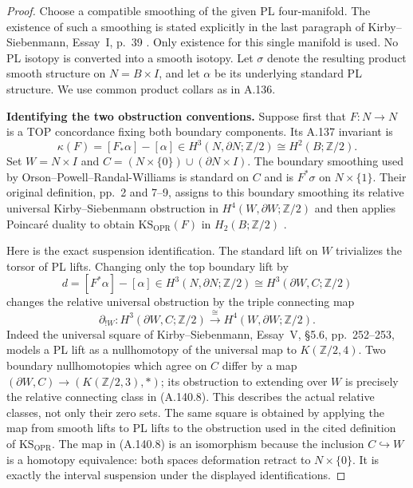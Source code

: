 \begin{proof}
Choose a compatible smoothing of the given PL four-manifold.
The existence of such a smoothing is stated explicitly in the
last paragraph of Kirby--Siebenmann, Essay~I, p.~39
\cite{KirbySiebenmann1977}. Only existence for this single
manifold is used. No PL isotopy is converted into a smooth isotopy.
Let $\sigma$ denote the resulting product smooth structure on
$N=B\times I$, and let $\alpha$ be its underlying standard PL
structure. We use common product collars as in A.136.

\textbf{Identifying the two obstruction conventions.}
Suppose first that $F:N\to N$ is a TOP concordance fixing both
boundary components. Its A.137 invariant is
\[
 \kappa(F)=[F_*\alpha]-[\alpha]
       \in H^3(N,\partial N;\mathbb Z/2)
       \cong H^2(B;\mathbb Z/2).                       \tag{A.140.7}
\]
Set $W=N\times I$ and
$C=(N\times\{0\})\cup(\partial N\times I)$.
The boundary smoothing used by Orson--Powell--Randal-Williams
is standard on $C$ and is $F^*\sigma$ on $N\times\{1\}$.
Their original definition, pp.~2 and 7--9, assigns to this boundary
smoothing its relative universal Kirby--Siebenmann obstruction in
$H^4(W,\partial W;\mathbb Z/2)$ and then applies Poincar\'e
duality to obtain $\mathrm{KS}_{\mathrm{OPR}}(F)$ in
$H_2(B;\mathbb Z/2)$
\cite[\S3.1, proof of Lemma~2.2, p.~9]{OrsonPowellRandalWilliams2026}.

Here is the exact suspension identification. The standard lift on
$W$ trivializes the torsor of PL lifts. Changing only the top
boundary lift by
\[
 d=[F^*\alpha]-[\alpha]
       \in H^3(N,\partial N;\mathbb Z/2)
       \cong H^3(\partial W,C;\mathbb Z/2)
\]
changes the relative universal obstruction by the triple connecting
map
\[
 \partial_{!W}:
 H^3(\partial W,C;\mathbb Z/2)
       \xrightarrow{\cong}H^4(W,\partial W;\mathbb Z/2).
                                                               \tag{A.140.8}
\]
Indeed the universal square of Kirby--Siebenmann, Essay~V,
\S5.6, pp.~252--253, models a PL lift as a nullhomotopy of the
universal map to $K(\mathbb Z/2,4)$. Two boundary nullhomotopies
which agree on $C$ differ by a map
$(\partial W,C)\to(K(\mathbb Z/2,3),*)$; its obstruction to
extending over $W$ is precisely the relative connecting class
in (A.140.8). This describes the actual relative classes, not only
their zero sets. The same square is obtained by applying the
map from smooth lifts to PL lifts to the obstruction used in
the cited definition of $\mathrm{KS}_{\mathrm{OPR}}$.
The map in (A.140.8) is an isomorphism because the inclusion
$C\hookrightarrow W$ is a homotopy equivalence: both spaces
deformation retract to $N\times\{0\}$. It is exactly the
interval suspension under the displayed identifications.


\end{proof}
